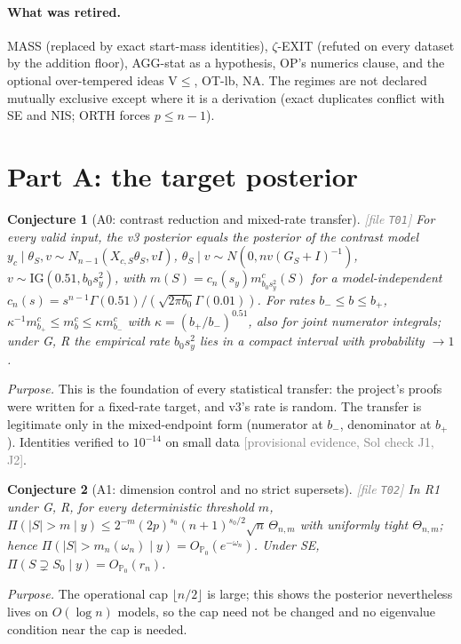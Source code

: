 \documentclass[11pt,a4paper]{article}
\theoremstyle{plain}
\newtheorem{conjecture}{Conjecture}[section]
\theoremstyle{definition}
\theoremstyle{remark}
\newcommand{\Pz}{\mathbb{P}_0}
\newcommand{\Sz}{S_0}
\newcommand{\sz}{s_0}
\newcommand{\IG}{\mathrm{IG}}
\newcommand{\rn}{r_n}
\newcommand{\provisional}[1]{\textcolor{gray}{[provisional evidence, Sol check #1]}}
\newcommand{\thfile}[1]{\textcolor{gray}{\footnotesize[file \texttt{#1}]}}
\begin{document}
\paragraph{What was retired.} MASS (replaced by exact start-mass identities), $\zeta$-EXIT (refuted on every dataset by the addition floor), AGG-stat as a hypothesis, OP's numerics clause, and the optional over-tempered ideas V$\le$, OT-lb, NA. The regimes are not declared mutually exclusive except where it is a derivation (exact duplicates conflict with SE and NIS; ORTH forces $p\le n-1$).

\section{Part A: the target posterior}

\begin{conjecture}[A0: contrast reduction and mixed-rate transfer]\thfile{T01}
For every valid input, the v3 posterior equals the posterior of the contrast model $y_c\mid\theta_S,v\sim N_{n-1}(X_{c,S}\theta_S,vI)$, $\theta_S\mid v\sim N(0,nv(G_S+I)^{-1})$, $v\sim\IG(0.51,b_0s_y^2)$, with $m(S)=c_n(s_y)m^c_{b_0s_y^2}(S)$ for a model-independent $c_n(s)=s^{n-1}\Gamma(0.51)/(\sqrt{2\pi b_0}\Gamma(0.01))$. For rates $b_-\le b\le b_+$, $\kappa^{-1}m^c_{b_+}\le m^c_b\le\kappa m^c_{b_-}$ with $\kappa=(b_+/b_-)^{0.51}$, also for joint numerator integrals; under G, R the empirical rate $b_0s_y^2$ lies in a compact interval with probability $\to1$.
\end{conjecture}
\emph{Purpose.} This is the foundation of every statistical transfer: the project's proofs were written for a fixed-rate target, and v3's rate is random. The transfer is legitimate only in the mixed-endpoint form (numerator at $b_-$, denominator at $b_+$). Identities verified to $10^{-14}$ on small data \provisional{J1, J2}.

\begin{conjecture}[A1: dimension control and no strict supersets]\thfile{T02}
In R1 under G, R, for every deterministic threshold $m$, $\Pi(|S|>m\mid y)\le2^{-m}(2p)^{\sz}(n+1)^{\sz/2}\sqrt n\,\Theta_{n,m}$ with uniformly tight $\Theta_{n,m}$; hence $\Pi(|S|>m_n(\omega_n)\mid y)=O_{\Pz}(e^{-\omega_n})$. Under SE, $\Pi(S\supsetneq\Sz\mid y)=O_{\Pz}(\rn)$.
\end{conjecture}
\emph{Purpose.} The operational cap $\lfloor n/2\rfloor$ is large; this shows the posterior nevertheless lives on $O(\log n)$ models, so the cap need not be changed and no eigenvalue condition near the cap is needed.
\end{document}
